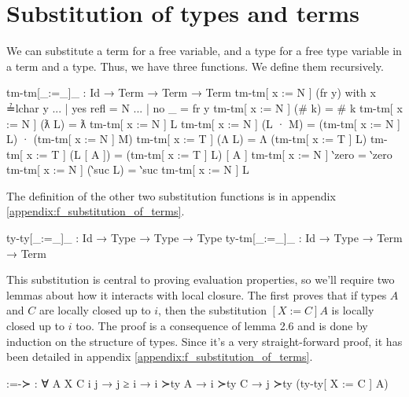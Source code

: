 \documentclass[logo,bsc,singlespacing,parskip,online]{infthesis}
\begin{document}
\section{Substitution of types and terms}
We can substitute a term for a free variable, and a type for a free type variable in a term and a
type. Thus, we have three functions. We define them recursively.
\begin{code}
  tm-tm[_:=_]_ : Id → Term → Term → Term
  tm-tm[ x := N ] (fr y) with x ≟lchar y
  ... | yes refl = N
  ... | no  _    = fr y
  tm-tm[ x := N ] (# k) = # k
  tm-tm[ x := N ] (ƛ L) = ƛ tm-tm[ x := N ] L
  tm-tm[ x := N ] (L · M) = (tm-tm[ x := N ] L) · (tm-tm[ x := N ] M)
  tm-tm[ x := T ] (Λ L) = Λ (tm-tm[ x := T ] L)
  tm-tm[ x := T ] (L [ A ]) = (tm-tm[ x := T ] L) [ A ]
  tm-tm[ x := N ] ‵zero = ‵zero
  tm-tm[ x := N ] (‵suc L) = ‵suc tm-tm[ x := N ] L
\end{code}
The definition of the other two substitution functions is in appendix
\ref{appendix:f_substitution_of_terms}.
\begin{code}
  ty-ty[_:=_]_ : Id → Type → Type → Type
  ty-tm[_:=_]_ : Id → Type → Term → Term
\end{code}
\begin{comment}
\begin{code}
  ty-ty[ X := T ] ‵ℕ = ‵ℕ
  ty-ty[ X := T ] (t-fr Y) with X ≟lchar Y
  ... | yes refl = T
  ... | no  _    = t-fr Y
  ty-ty[ X := T ] (t-# k) = t-# k
  ty-ty[ X := T ] (A ⇒ B) = (ty-ty[ X := T ] A) ⇒ (ty-ty[ X := T ] B)
  ty-ty[ X := T ] (t-∀ A) = t-∀ (ty-ty[ X := T ] A)

  ty-tm[ X := T ] (fr x) = fr x
  ty-tm[ X := T ] (# k) = # k
  ty-tm[ X := T ] (ƛ L) = ƛ (ty-tm[ X := T ] L)
  ty-tm[ X := T ] (L · M) = (ty-tm[ X := T ] L) · (ty-tm[ X := T ] M)
  ty-tm[ X := T ] (Λ L) = Λ (ty-tm[ X := T ] L)
  ty-tm[ X := T ] (L [ A ]) = (ty-tm[ X := T ] L) [ ty-ty[ X := T ] A ]
  ty-tm[ X := T ] ‵zero = ‵zero
  ty-tm[ X := T ] (‵suc L) = ‵suc ty-tm[ X := T ] L
\end{code}
\end{comment}

This substitution is central to proving evaluation properties, so we'll require two lemmas about how
it interacts with local closure. The first proves that if types $A$ and $C$ are locally closed up to
$i$, then the substitution $[X := C] A$ is locally closed up to $i$ too. The proof is a consequence
of lemma 2.6 and is done by induction on the structure of types. Since it's a very straight-forward
proof, it has been detailed in appendix \ref{appendix:f_substitution_of_terms}.
\begin{code}
  :=-≻ : ∀ {A X C i j} → j ≥ i → i ≻ty A → i ≻ty C
    → j ≻ty (ty-ty[ X := C ] A)
\end{code}
\end{document}

